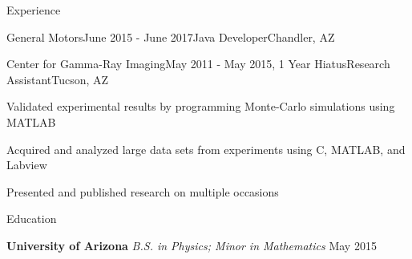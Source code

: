 \documentclass{resume} %
\begin{document}
\begin{rSection}{Experience}
\begin{rSubsection}{General Motors}{June 2015 - June 2017}{Java Developer}{Chandler, AZ}
\end{rSubsection}


\begin{rSubsection}{Center for Gamma-Ray Imaging}{May 2011 - May 2015, 1 Year Hiatus}{Research Assistant}{Tucson, AZ}
\item Validated experimental results by programming Monte-Carlo simulations using MATLAB
\item Acquired and analyzed large data sets from experiments using C, MATLAB, and Labview 
\item Presented and published research on multiple occasions

\end{rSubsection}

\end{rSection}


\begin{rSection}{Education}
	
	{\bf University of Arizona} {\em B.S. in Physics; Minor in Mathematics} \hfill {May 2015} \\ 
	\nolinebreak	
	
\end{rSection}


%	
%
\end{document}
